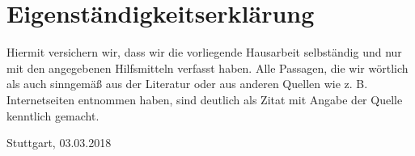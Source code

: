 \clearpage
\section*{Eigenständigkeitserklärung}
\vspace*{2cm}
\begin{center}
	\begin{minipage}[t]{0.8\textwidth}
		Hiermit versichern wir, dass wir die vorliegende Hausarbeit selbständig und nur mit den angegebenen Hilfsmitteln verfasst haben. Alle Passagen, die wir wörtlich als auch sinngemäß aus der Literatur oder aus anderen Quellen wie z. B. Internetseiten entnommen haben, sind deutlich als Zitat mit Angabe der Quelle kenntlich gemacht.
		
		\vspace*{60mm}
		Stuttgart, 03.03.2018
	\end{minipage}
\end{center}




